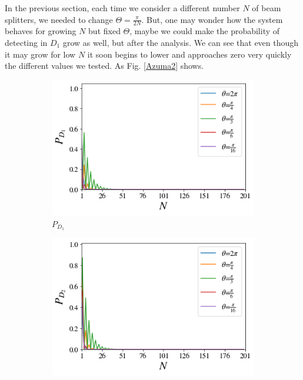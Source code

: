 \documentclass[12pt]{book}
\begin{document}
In the previous section, each time we consider a different number $N$ of beam splitters, we needed to change $\Theta = \frac{\pi}{2N}$. But, one may wonder  how the system behaves for growing $N$ but fixed $\Theta$, maybe we could make the probability of detecting in $D_{1}$ grow as well, but after the analysis. We can see that even though it may grow for low $N$ it soon begins to lower and approaches zero very quickly the different values we tested. As Fig. \ref{Azuma2} shows.


\begin{figure}[!t]
\centering
\begin{subfigure}[b]{0.45\linewidth}
\includegraphics[width=\linewidth]{images/BsFijo_azumaD1.png}
\caption{$P_{D_{1}}$}
\label{fig:BS1}
\end{subfigure}
\begin{subfigure}[b]{0.45\linewidth}
\includegraphics[width=\linewidth]{images/BsFijo_azumaD2.png}

\end{subfigure}
\end{figure}
\end{document}
